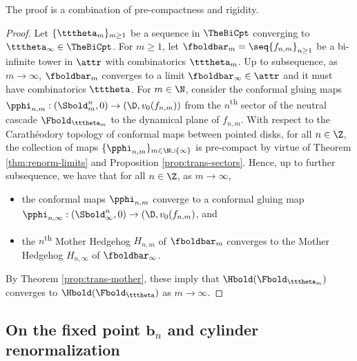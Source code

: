\documentclass{amsart}
\begin{document}
The proof is a combination of pre-compactness and rigidity.

\begin{proof}
    Let $\{\tttheta_m\}_{m\geq 1}$ be a sequence in $\TheBiCpt$ converging to $\tttheta_\infty \in \TheBiCpt$.
    For $m \geq 1$, let $\fboldbar_m = \seq{ f_{n,m} }_{n\geq 1}$ be a bi-infinite tower in $\attr$ with combinatorics $\tttheta_m$.
    Up to subsequence, as $m \to \infty$, $\fboldbar_m$ converges to a limit $\fboldbar_\infty \in \attr$ and it must have combinatorics $\tttheta$.
    For $m \in \N$, consider the conformal gluing maps $\pphi_{n,m}: (\Sbold^n_m, 0) \to (\D, v_0(f_{n,m}))$ from the $n$\textsuperscript{th} sector of the neutral cascade
    $\Fbold_{\tttheta_m}$ to the dynamical plane of $f_{n,m}$.
    With respect to the Carath\'eodory topology of conformal maps between pointed disks, for all $n \in \Z$, the collection of maps $\{ \pphi_{n,m} \}_{m \in \N \cup \{\infty\}}$ is pre-compact by virtue of Theorem \ref{thm:renorm-limits} and Proposition \ref{prop:trans-sectors}.
    Hence, up to further subsequence, we have that for all $n \in \Z$, as $m \to \infty$,
    \begin{itemize}
        \item the conformal maps $\pphi_{n,m}$ converge to a conformal gluing map $\pphi_{n,\infty}: (\Sbold^n_\infty, 0) \to (\D, v_0(f_{n,m})$, and
        \item the $n$\textsuperscript{th} Mother Hedgehog $H_{n,m}$ of $\fboldbar_m$ converges to the Mother Hedgehog $H_{n,\infty}$ of $\fboldbar_\infty$.
    \end{itemize}
    By Theorem \ref{prop:trans-mother}, these imply that $\Hbold(\Fbold_{\tttheta_m})$ converges to $\Hbold(\Fbold_{\tttheta})$ as $m \to \infty$.
\end{proof}

\subsection{On the fixed point $\mathbf{b}_n$ and cylinder renormalization}
\label{ss:cylinder}
\end{document}
